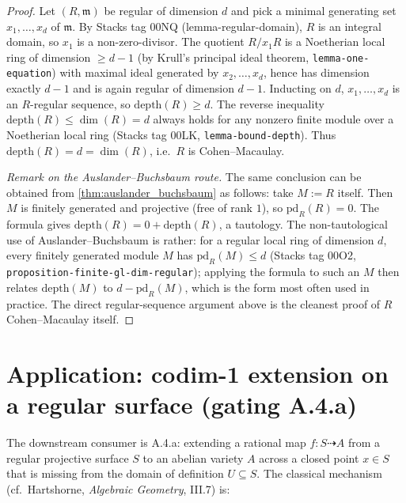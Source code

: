 \begin{proof}
  
  
\leanok
  Let \((R, \mathfrak{m})\) be regular of dimension \(d\) and pick a minimal generating set
  \(x_1, \dots, x_d\) of \(\mathfrak{m}\). By Stacks tag 00NQ (lemma-regular-domain), \(R\) is
  an integral domain, so \(x_1\) is a non-zero-divisor. The quotient \(R/x_1 R\) is a Noetherian
  local ring of dimension \(\geq d - 1\) (by Krull's principal ideal theorem,
  \texttt{lemma-one-equation}) with maximal ideal generated by \(x_2, \dots, x_d\), hence
  has dimension exactly \(d - 1\) and is again regular of dimension \(d - 1\). Inducting on \(d\),
  \(x_1, \dots, x_d\) is an \(R\)-regular sequence, so
  \(\text{depth}(R) \geq d\). The reverse inequality \(\text{depth}(R) \leq \dim(R) = d\)
  always holds for any nonzero finite module over a Noetherian local ring
  (Stacks tag 00LK, \texttt{lemma-bound-depth}). Thus \(\text{depth}(R) = d = \dim(R)\), i.e.\
  \(R\) is Cohen--Macaulay.

  \emph{Remark on the Auslander--Buchsbaum route.} The same conclusion can be obtained from
  \cref{thm:auslander_buchsbaum} as follows: take \(M := R\) itself. Then \(M\) is
  finitely generated and projective (free of rank \(1\)), so \(\text{pd}_R(R) = 0\). The
  formula gives \(\text{depth}(R) = 0 + \text{depth}(R)\), a tautology. The non-tautological
  use of Auslander--Buchsbaum is rather: for a regular local ring of dimension \(d\), every
  finitely generated module \(M\) has \(\text{pd}_R(M) \leq d\) (Stacks tag 00O2,
  \texttt{proposition-finite-gl-dim-regular}); applying the formula to such an \(M\) then
  relates \(\text{depth}(M)\) to \(d - \text{pd}_R(M)\), which is the form most often used in
  practice. The direct regular-sequence argument above is the cleanest proof of
  \(R\) Cohen--Macaulay itself.
\end{proof}

\section{Application: codim-1 extension on a regular surface (gating A.4.a)}
\label{sec:ab_application_to_a4a}

The downstream consumer is A.4.a: extending a rational map
\(f : S \dashrightarrow A\) from a regular projective surface \(S\) to an abelian variety \(A\)
across a closed point \(x \in S\) that is missing from the domain of definition \(U \subseteq S\).
The classical mechanism (cf.\ Hartshorne, \emph{Algebraic Geometry}, III.7) is:

